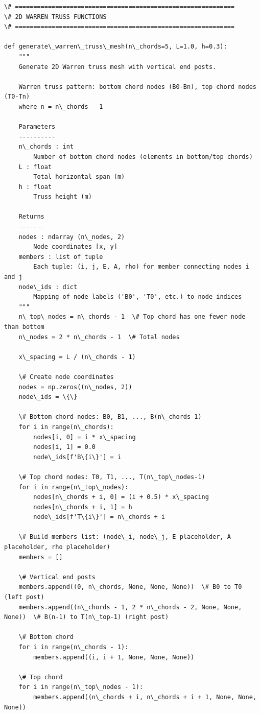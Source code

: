 \documentclass[12pt, a4paper]{article}
\begin{document}
\begin{lstlisting}[style=codestyle, caption={{truss.py --- 1D and 2D Truss Analysis}}]
\# ============================================================
\# 2D WARREN TRUSS FUNCTIONS
\# ============================================================

def generate\_warren\_truss\_mesh(n\_chords=5, L=1.0, h=0.3):
    """
    Generate 2D Warren truss mesh with vertical end posts.

    Warren truss pattern: bottom chord nodes (B0-Bn), top chord nodes (T0-Tn)
    where n = n\_chords - 1

    Parameters
    ----------
    n\_chords : int
        Number of bottom chord nodes (elements in bottom/top chords)
    L : float
        Total horizontal span (m)
    h : float
        Truss height (m)

    Returns
    -------
    nodes : ndarray (n\_nodes, 2)
        Node coordinates [x, y]
    members : list of tuple
        Each tuple: (i, j, E, A, rho) for member connecting nodes i and j
    node\_ids : dict
        Mapping of node labels ('B0', 'T0', etc.) to node indices
    """
    n\_top\_nodes = n\_chords - 1  \# Top chord has one fewer node than bottom
    n\_nodes = 2 * n\_chords - 1  \# Total nodes

    x\_spacing = L / (n\_chords - 1)

    \# Create node coordinates
    nodes = np.zeros((n\_nodes, 2))
    node\_ids = \{\}

    \# Bottom chord nodes: B0, B1, ..., B(n\_chords-1)
    for i in range(n\_chords):
        nodes[i, 0] = i * x\_spacing
        nodes[i, 1] = 0.0
        node\_ids[f'B\{i\}'] = i

    \# Top chord nodes: T0, T1, ..., T(n\_top\_nodes-1)
    for i in range(n\_top\_nodes):
        nodes[n\_chords + i, 0] = (i + 0.5) * x\_spacing
        nodes[n\_chords + i, 1] = h
        node\_ids[f'T\{i\}'] = n\_chords + i

    \# Build members list: (node\_i, node\_j, E placeholder, A placeholder, rho placeholder)
    members = []

    \# Vertical end posts
    members.append((0, n\_chords, None, None, None))  \# B0 to T0 (left post)
    members.append((n\_chords - 1, 2 * n\_chords - 2, None, None, None))  \# B(n-1) to T(n\_top-1) (right post)

    \# Bottom chord
    for i in range(n\_chords - 1):
        members.append((i, i + 1, None, None, None))

    \# Top chord
    for i in range(n\_top\_nodes - 1):
        members.append((n\_chords + i, n\_chords + i + 1, None, None, None))


\end{lstlisting}
\end{document}
